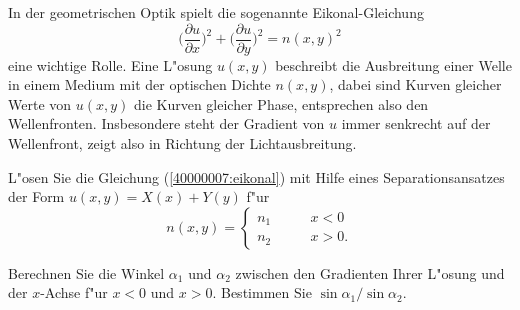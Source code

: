 In der geometrischen Optik spielt die sogenannte Eikonal-Gleichung
\begin{equation}
\biggl( \frac{\partial u}{\partial x}\biggr)^2
+
\biggl( \frac{\partial u}{\partial y}\biggr)^2
=
n(x,y)^2
\label{40000007:eikonal}
\end{equation}
eine wichtige Rolle.
Eine L"osung $u(x,y)$ beschreibt die
Ausbreitung einer Welle in einem Medium mit der optischen
Dichte  $n(x,y)$, dabei sind Kurven gleicher Werte von $u(x,y)$
die Kurven gleicher Phase, entsprechen also den Wellenfronten.
Insbesondere steht der Gradient von $u$ immer senkrecht auf
der Wellenfront, zeigt also in Richtung der Lichtausbreitung.
\begin{teilaufgaben}
\item
L"osen Sie die Gleichung
(\ref{40000007:eikonal}) mit Hilfe eines Separationsansatzes
der Form $u(x,y)=X(x) + Y(y)$
f"ur 
\[
n(x,y)=
\begin{cases}n_1&\qquad x< 0\\
n_2&\qquad x>0.
\end{cases}
\]
\item
Berechnen Sie die Winkel $\alpha_1$ und $\alpha_2$ zwischen den Gradienten
Ihrer L"osung und der $x$-Achse f"ur $x<0$ und $x>0$. Bestimmen Sie 
$\sin\alpha_1/\sin\alpha_2$.
\end{teilaufgaben}

